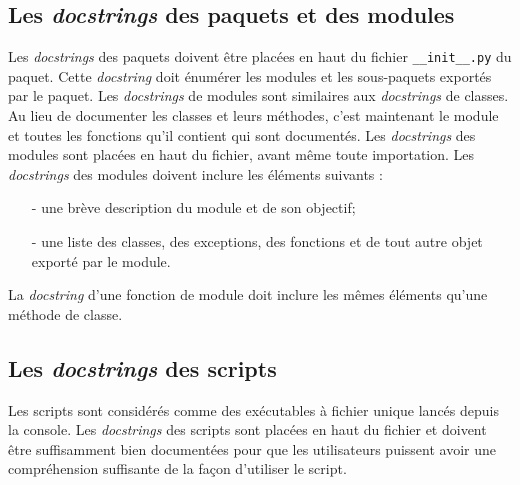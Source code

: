 \documentclass[a4paper,12pt]{book}
\begin{document}
\subsection*{Les \textit{docstrings} des paquets et des modules}
Les \textit{docstrings} des paquets doivent être placées en haut du fichier \texttt{\_\_init\_\_.py} du paquet. Cette \textit{docstring} doit énumérer les modules et les sous-paquets exportés par le paquet. Les \textit{docstrings} de modules sont similaires aux \textit{docstrings} de classes. Au lieu de documenter les classes et leurs méthodes, c'est maintenant le module et toutes les fonctions qu'il contient qui sont documentés. Les \textit{docstrings} des modules sont placées en haut du fichier, avant même toute importation. Les \textit{docstrings} des modules doivent inclure les éléments suivants :
\begin{itemize}
	\item[-] une brève description du module et de son objectif;
	\item[-] une liste des classes, des exceptions, des fonctions et de tout autre objet exporté par le module.
\end{itemize}
\medskip

La \textit{docstring} d'une fonction de module doit inclure les mêmes éléments qu'une méthode de classe.
\medskip

\subsection*{Les \textit{docstrings} des scripts}
Les scripts sont considérés comme des exécutables à fichier unique lancés depuis la console. Les \textit{docstrings} des scripts sont placées en haut du fichier et doivent être suffisamment bien documentées pour que les utilisateurs puissent avoir une compréhension suffisante de la façon d'utiliser le script.
\medskip
\end{document}

